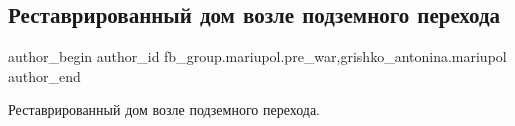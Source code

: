  
 
 
 
 

\subsection{Реставрированный дом возле подземного перехода}
\label{sec:20_01_2023.fb.fb_group.mariupol.pre_war.3.restavrirovannii_dom}
 
\ifcmt
 author_begin
   author_id fb_group.mariupol.pre_war,grishko_antonina.mariupol
 author_end
\fi

Реставрированный дом возле подземного перехода.
